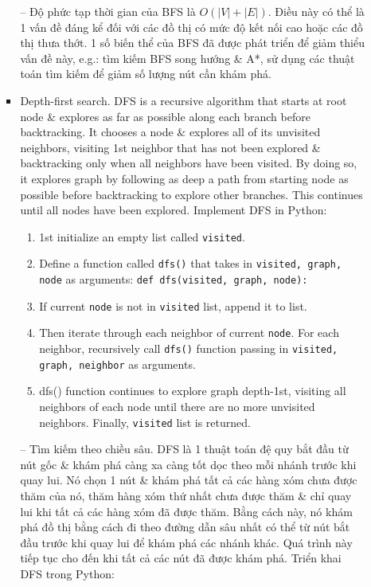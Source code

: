 \documentclass{article}
\begin{document}
\begin{itemize}
\begin{itemize}
\begin{itemize}
            -- Độ phức tạp thời gian của BFS là $O(|V| + |E|)$. Điều này có thể là 1 vấn đề đáng kể đối với các đồ thị có mức độ kết nối cao hoặc các đồ thị thưa thớt. 1 số biến thể của BFS đã được phát triển để giảm thiểu vấn đề này, e.g.: tìm kiếm BFS song hướng \& A*, sử dụng các thuật toán tìm kiếm để giảm số lượng nút cần khám phá.
            \item {\sf Depth-first search.} DFS is a recursive algorithm that starts at root node \& explores as far as possible along each branch before backtracking. It chooses a node \& explores all of its unvisited neighbors, visiting 1st neighbor that has not been explored \& backtracking only when all neighbors have been visited. By doing so, it explores graph by following as deep a path from starting node as possible before backtracking to explore other branches. This continues until all nodes have been explored. Implement DFS in Python:
            \begin{enumerate}
                \item 1st initialize an empty list called {\tt visited}.
                \item Define a function called {\tt dfs()} that takes in {\tt visited, graph, node} as arguments: {\tt def dfs(visited, graph, node):}
                \item If current {\tt node} is not in {\tt visited} list, append it to list.
                \item Then iterate through each neighbor of current {\tt node}. For each neighbor, recursively call {\tt dfs()} function passing in {\tt visited, graph, neighbor} as arguments.
                \item {\sf dfs()} function continues to explore graph depth-1st, visiting all neighbors of each node until there are no more unvisited neighbors. Finally, {\tt visited} list is returned.
            \end{enumerate}
            -- {\sf Tìm kiếm theo chiều sâu.} DFS là 1 thuật toán đệ quy bắt đầu từ nút gốc \& khám phá càng xa càng tốt dọc theo mỗi nhánh trước khi quay lui. Nó chọn 1 nút \& khám phá tất cả các hàng xóm chưa được thăm của nó, thăm hàng xóm thứ nhất chưa được thăm \& chỉ quay lui khi tất cả các hàng xóm đã được thăm. Bằng cách này, nó khám phá đồ thị bằng cách đi theo đường dẫn sâu nhất có thể từ nút bắt đầu trước khi quay lui để khám phá các nhánh khác. Quá trình này tiếp tục cho đến khi tất cả các nút đã được khám phá. Triển khai DFS trong Python:
            \begin{enumerate}

\end{enumerate}
\end{itemize}
\end{itemize}
\end{itemize}
\end{document}
